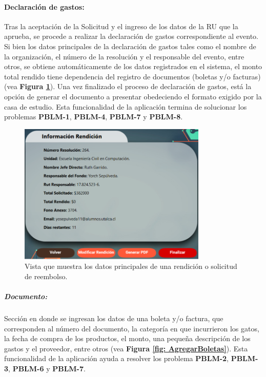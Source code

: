 \paragraph{Declaración de gastos: } Tras la aceptación de la Solicitud y el ingreso de los datos de la RU que la aprueba, se procede a realizar la declaración de gastos correspondiente al evento. Si bien los datos principales de la declaración de gastos tales como el nombre de la organización, el número de la resolución y el responsable del evento, entre otros, se obtiene automáticamente de los datos registrados en el sistema, el monto total rendido tiene dependencia del registro de documentos (boletas y/o facturas) (vea \textbf{Figura \ref{fig: Rendicion}}). Una vez finalizado el proceso de declaración de gastos, está la opción de generar el documento a presentar obedeciendo el formato exigido por la casa de estudio. Esta funcionalidad de la aplicación termina de solucionar los problemas \textbf{PBLM-1}, \textbf{PBLM-4}, \textbf{PBLM-7} y \textbf{PBLM-8}.

\begin{figure}[h]
    \centering
    \includegraphics[width= 0.8\textwidth]{Imagenes/Rendicion.png}
    \caption{\label{fig: Rendicion}Vista que muestra los datos principales de una rendición o solicitud de reembolso.}
\end{figure}
    \subparagraph{\emph{Documento: }} Sección en donde se ingresan los datos de una boleta y/o factura, que corresponden al número del documento, la categoría en que incurrieron los gatos, la fecha de compra de los productos, el monto, una pequeña descripción de los gastos y el proveedor, entre otros (vea \textbf{Figura \ref{fig: AgregarBoletas}}). Esta funcionalidad de la aplicación ayuda a resolver los problema \textbf{PBLM-2}, \textbf{PBLM-3}, \textbf{PBLM-6} y \textbf{PBLM-7}.


